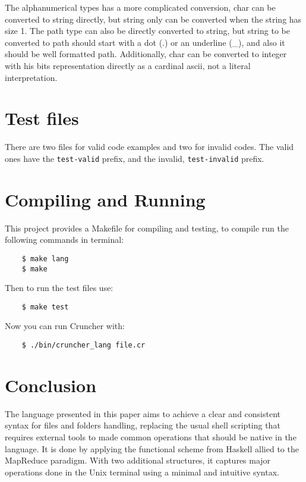 \documentclass{article}
\begin{document}
The alphanumerical types has a more complicated conversion, char can be
converted to string directly, but string only can be converted when the string
has size 1.  The path type can also be directly converted to string, but string
to be converted to path should start with a dot (.) or an underline (_), and
also it should be well formatted path. Additionally, char can be converted to
integer with his bits representation directly as a cardinal ascii, not a
literal interpretation.

\section{Test files}
\label{sec:test}
There are two files for valid code examples and two for invalid codes. The
valid ones have the \texttt{test-valid} prefix, and the invalid,
\texttt{test-invalid} prefix.

\section{Compiling and Running}%
\label{sec:compiling}
This project provides a Makefile for compiling and testing, to compile run the
following commands in terminal:
\begin{verbatim}
    $ make lang
    $ make
\end{verbatim}

Then to run the test files use:
\begin{verbatim}
    $ make test
\end{verbatim}

Now you can run Cruncher with:
\begin{verbatim}
    $ ./bin/cruncher_lang file.cr
\end{verbatim}

\section{Conclusion}
\label{sec:conclusion}
The language presented in this paper aims to achieve a clear and consistent
syntax for files and folders handling, replacing the usual shell scripting that
requires external tools to made common operations that should be native in the
language. It is done by applying the functional scheme from Haskell allied to
the MapReduce paradigm. With two additional structures, it captures major
operations done in the Unix terminal using a minimal and intuitive syntax.



\end{document}
